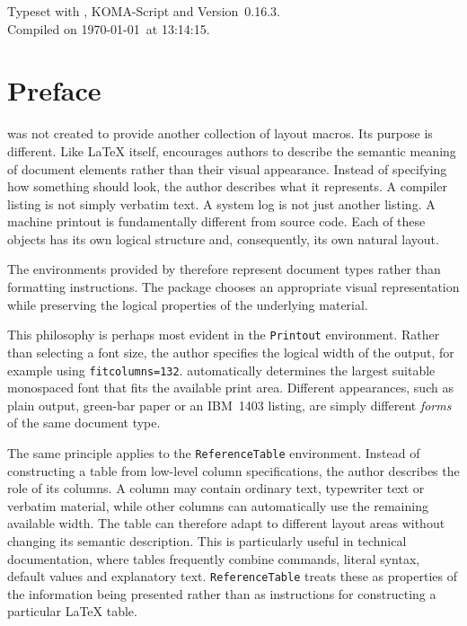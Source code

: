 \documentclass[
11pt,
a4paper,
oneside
]{scrbook}
\begin{document}
\bigskip

\noindent
Typeset with \usedtexengine, KOMA-Script and
\MDWordmark Version~0.16.3.\\
Compiled on \today\ at 13:14:15.


\chapter*{Preface}


\MDWordmark was not created to provide another collection of layout
macros. Its purpose is different. 
Like \LaTeX{} itself, \MDWordmark encourages authors to describe the
semantic meaning of document elements rather than their visual
appearance. 
Instead of specifying how something should look, the author
describes what it represents.
A compiler listing is not simply verbatim text. A system log is not just
another listing. A machine printout is fundamentally different from
source code. Each of these objects has its own logical structure and,
consequently, its own natural layout.

The environments provided by \MDWordmark therefore represent document
types rather than formatting instructions. The package chooses an
appropriate visual representation while preserving the logical
properties of the underlying material.

This philosophy is perhaps most evident in the \texttt{Printout}
environment. Rather than selecting a font size, the author specifies the
logical width of the output, for example using
\texttt{fitcolumns=132}. \MDWordmark automatically determines the
largest suitable monospaced font that fits the available print area.
Different appearances, such as plain output, green-bar paper or an
IBM~1403 listing, are simply different \emph{forms} of the same document
type.

The same principle applies to the \texttt{ReferenceTable} environment.
Instead of constructing a table from low-level column specifications,
the author describes the role of its columns. A column may contain
ordinary text, typewriter text or verbatim material, while other columns
can automatically use the remaining available width. The table can
therefore adapt to different layout areas without changing its semantic
description.
This is particularly useful in technical documentation, where tables
frequently combine commands, literal syntax, default values and
explanatory text. \texttt{ReferenceTable} treats these as properties of
the information being presented rather than as instructions for
constructing a particular \LaTeX{} table.
\end{document}
